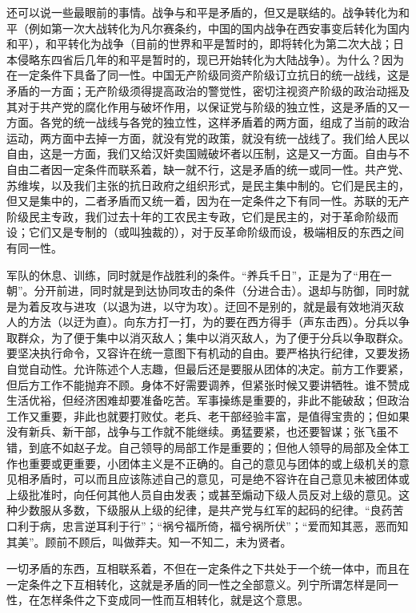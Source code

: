 还可以说一些最眼前的事情。战争与和平是矛盾的，但又是联结的。战争转化为和平（例如第一次大战转化为凡尔赛条约，中国的国内战争在西安事变后转化为国内和平），和平转化为战争（目前的世界和平是暂时的，即将转化为第二次大战；日本侵略东四省后几年的和平是暂时的，现已开始转化为大陆战争）。为什么？因为在一定条件下具备了同一性。中国无产阶级同资产阶级订立抗日的统一战线，这是矛盾的一方面；无产阶级须得提高政治的警觉性，密切注视资产阶级的政治动摇及其对于共产党的腐化作用与破坏作用，以保证党与阶级的独立性，这是矛盾的又一方面。各党的统一战线与各党的独立性，这样矛盾着的两方面，组成了当前的政治运动，两方面中去掉一方面，就没有党的政策，就没有统一战线了。我们给人民以自由，这是一方面，我们又给汉奸卖国贼破坏者以压制，这是又一方面。自由与不自由二者因一定条件而联系着，缺一就不行，这是矛盾的统一或同一性。共产党、苏维埃，以及我们主张的抗日政府之组织形式，是民主集中制的。它们是民主的，但又是集中的，二者矛盾而又统一着，因为在一定条件之下有同一性。苏联的无产阶级民主专政，我们过去十年的工农民主专政，它们是民主的，对于革命阶级而设；它们又是专制的（或叫独裁的），对于反革命阶级而设，极端相反的东西之间有同一性。

军队的休息、训练，同时就是作战胜利的条件。“养兵千日”，正是为了“用在一朝”。分开前进，同时就是到达协同攻击的条件（分进合击）。退却与防御，同时就是为着反攻与进攻（以退为进，以守为攻）。迂回不是别的，就是最有效地消灭敌人的方法（以迂为直）。向东方打一打，为的要在西方得手（声东击西）。分兵以争取群众，为了便于集中以消灭敌人；集中以消灭敌人，为了便于分兵以争取群众。要坚决执行命令，又容许在统一意图下有机动的自由。要严格执行纪律，又要发扬自觉自动性。允许陈述个人志趣，但最后还是要服从团体的决定。前方工作要紧，但后方工作不能抛弃不顾。身体不好需要调养，但紧张时候又要讲牺牲。谁不赞成生活优裕，但经济困难却要准备吃苦。军事操练是重要的，非此不能破敌；但政治工作又重要，非此也就要打败仗。老兵、老干部经验丰富，是值得宝贵的；但如果没有新兵、新干部，战争与工作就不能继续。勇猛要紧，也还要智谋；张飞虽不错，到底不如赵子龙。自己领导的局部工作是重要的；但他人领导的局部及全体工作也重要或更重要，小团体主义是不正确的。自己的意见与团体的或上级机关的意见相矛盾时，可以而且应该陈述自己的意见，可是绝不容许在自己意见未被团体或上级批准时，向任何其他人员自由发表；或甚至煽动下级人员反对上级的意见。这种少数服从多数，下级服从上级的纪律，是共产党与红军的起码的纪律。“良药苦口利于病，忠言逆耳利于行”；“祸兮福所倚，福兮祸所伏”；“爱而知其恶，恶而知其美”。顾前不顾后，叫做莽夫。知一不知二，未为贤者。

一切矛盾的东西，互相联系着，不但在一定条件之下共处于一个统一体中，而且在一定条件之下互相转化，这就是矛盾的同一性之全部意义。列宁所谓怎样是同一性，在怎样条件之下变成同一性而互相转化，就是这个意思。

